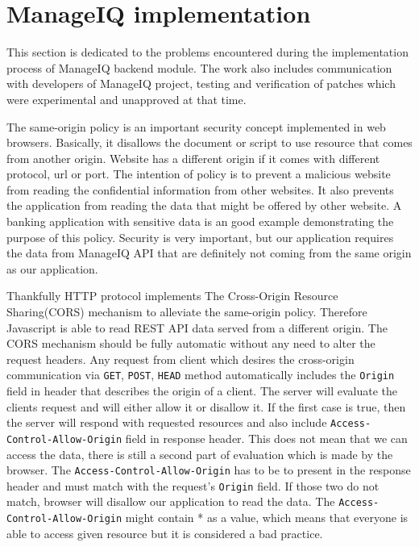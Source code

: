 \section{ManageIQ implementation}
This section is dedicated to the problems encountered during the implementation process of ManageIQ backend module. The work also includes communication with developers of ManageIQ project, testing and verification of patches which were experimental and unapproved at that time.

The same-origin policy \cite{policy} is an important security concept implemented in web browsers. Basically, it disallows the document or script to use resource that comes from another origin. Website has a different origin if it comes with different protocol, url or port. The intention of policy is to prevent a malicious website from reading the confidential information from other websites. It also prevents the application from reading the data that might be offered by other website. A banking application with sensitive data is an good example demonstrating the purpose of this policy. Security is very important, but our application requires the data from ManageIQ API that are definitely not coming from the same origin as our application.

Thankfully HTTP protocol implements The Cross-Origin Resource Sharing(CORS) \cite{cors} mechanism to alleviate the same-origin policy. Therefore Javascript is able to read REST API data served from a different origin. The CORS mechanism should be fully automatic without any need to alter the request headers. Any request from client which desires the cross-origin communication via \texttt{GET}, \texttt{POST}, \texttt{HEAD} method automatically includes the \texttt{Origin} field in header that describes the origin of a client. The server will evaluate the clients request and will either allow it or disallow it. If the first case is true, then the server will respond with requested resources and also include \texttt{Access-Control-Allow-Origin} field in response header. This does not mean that we can access the data, there is still a second part of evaluation which is made by the browser. The \texttt{Access-Control-Allow-Origin} has to be to present in the response header and must match with the request's \texttt{Origin} field. If those two do not match, browser will disallow our application to read the data. The \texttt{Access-Control-Allow-Origin} might contain * as a value, which means that everyone is able to access given resource but it is considered a bad practice.

